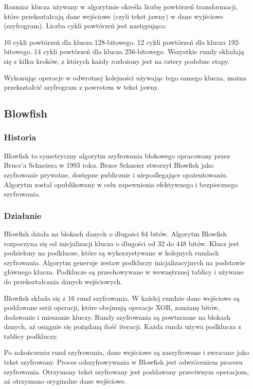 Rozmiar klucza używany w algorytmie określa liczbę powtórzeń transformacji, które przekształcają dane wejściowe (czyli tekst jawny) w dane wyjściowe (szyfrogram). Liczba cykli powtórzeń jest następująca:

10 cykli powtórzeń dla klucza 128-bitowego.
12 cykli powtórzeń dla klucza 192-bitowego.
14 cykli powtórzeń dla klucza 256-bitowego.
Wszystkie rundy składają się z kilku kroków, z których każdy rozłożony jest na cztery podobne etapy.

Wykonując operacje w odwrotnej kolejności używając tego samego klucza, można przekształcić szyfrogram z powrotem w tekst jawny.
\subsection{Blowfish}
\subsubsection{Historia}
Blowfish to symetryczny algorytm szyfrowania blokowego opracowany przez Bruce'a Schneiera w 1993 roku. Bruce Schneier stworzył Blowfish jako szyfrowanie prywatne, dostępne publicznie i niepodlegające opatentowaniu. Algorytm został opublikowany w celu zapewnienia efektywnego i bezpiecznego szyfrowania.

\subsubsection{Działanie}
Blowfish działa na blokach danych o długości 64 bitów. Algorytm Blowfish rozpoczyna się od inicjalizacji klucza o długości od 32 do 448 bitów. Klucz jest podzielony na podklucze, które są wykorzystywane w kolejnych rundach szyfrowania. Algorytm generuje zestaw podkluczy inicjalizacyjnych na podstawie głównego klucza. Podklucze są przechowywane w wewnętrznej tablicy i używane do przekształcania danych wejściowych. 

Blowfish składa się z 16 rund szyfrowania. W każdej rundzie dane wejściowe są poddawane serii operacji, które obejmują operacje XOR, zamianę bitów, dodawanie i mieszanie kluczy. Rundy szyfrowania są powtarzane na blokach danych, aż osiągnie się pożądaną ilość iteracji. Każda runda używa podklucza z tablicy podkluczy. 

Po zakończeniu rund szyfrowania, dane wejściowe są zaszyfrowane i zwracane jako tekst szyfrowany. Proces odszyfrowywania w Blowfish jest odwróceniem procesu szyfrowania. Otrzymany tekst szyfrowany jest poddawany przeciwnym operacjom, aż otrzymano oryginalne dane wejściowe.

